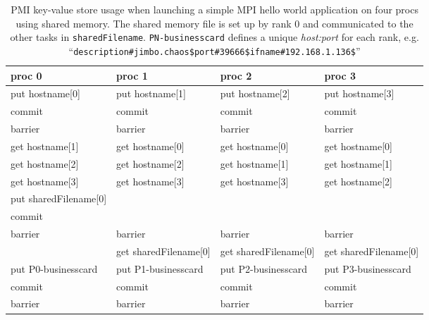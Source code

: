 \begin{table}
\centering
\begin{tabular}{|p{4cm}|p{4cm}|p{4cm}|p{4cm}|}\hline
\textbf{proc 0} &       \textbf{proc 1} &   \textbf{proc 2} &    \textbf{proc 3}\\
\hline
put hostname[0] &     put hostname[1] &     put hostname[2] &     put hostname[3]\\
commit &              commit &              commit  &             commit\\
barrier &             barrier &             barrier &             barrier\\
\hline
get hostname[1] &     get hostname[0] &     get hostname[0] &     get hostname[0]\\
get hostname[2] &     get hostname[2] &     get hostname[1] &     get hostname[1]\\
get hostname[3] &     get hostname[3] &     get hostname[3] &     get hostname[2]\\
put sharedFilename[0] & & & \\
commit  & & &\\
barrier& barrier & barrier & barrier\\
\hline
 &                     get sharedFilename[0]&get sharedFilename[0]&get sharedFilename[0]\\
put P0-businesscard & put P1-businesscard & put P2-businesscard & put P3-businesscard\\
commit &              commit &              commit &              commit\\
barrier &             barrier &             barrier &             barrier\\
\hline
\end{tabular}
\caption{ PMI key-value store usage when launching a simple 
MPI hello world application on four procs using shared memory.
The shared memory file
is set up by rank 0 and communicated to the other tasks in {\tt sharedFilename}.
{\tt PN-businesscard} defines a unique {\em host:port} for each rank, e.g.
``{\tt description\#jimbo.chaos\$port\#39666\$ifname\#192.168.1.136\$}''}
\label{tab:mvapich}
\end{table}

